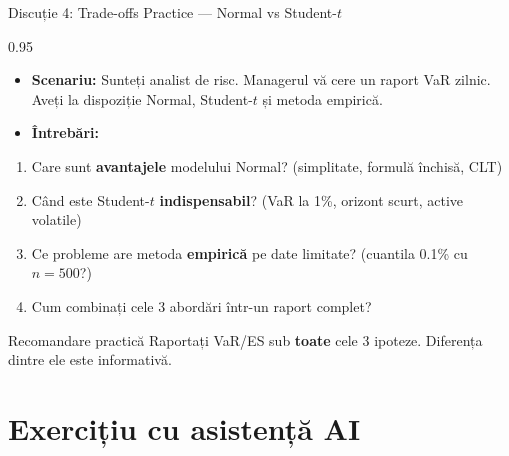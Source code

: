 \documentclass[9pt, aspectratio=169, t]{beamer}
\begin{document}
\begin{frame}{Discuție 4: Trade-offs Practice --- Normal vs Student-$t$}
\begin{cminipage}{0.95\textwidth}
    \begin{itemize}\setlength{\itemsep}{0pt}
        \item \textbf{Scenariu:} Sunteți analist de risc. Managerul vă cere un raport VaR zilnic. Aveți la dispoziție Normal, Student-$t$ și metoda empirică.
        \item \textbf{Întrebări:}
    \end{itemize}
    \begin{enumerate}\setlength{\itemsep}{0pt}
        \item Care sunt \textbf{avantajele} modelului Normal? (simplitate, formulă închisă, CLT)
        \item Când este Student-$t$ \textbf{indispensabil}? (VaR la 1\%, orizont scurt, active volatile)
        \item Ce probleme are metoda \textbf{empirică} pe date limitate? (cuantila 0.1\% cu $n = 500$?)
        \item Cum combinați cele 3 abordări într-un raport complet?
    \end{enumerate}

    \vspace{0.2cm}
    \begin{block}{Recomandare practică}
        {\small Raportați VaR/ES sub \textbf{toate} cele 3 ipoteze. Diferența dintre ele este informativă.}
    \end{block}
\end{cminipage}
\end{frame}

\section{Exercițiu cu asistență AI}
\end{document}
